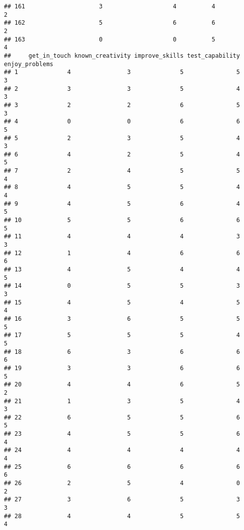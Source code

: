 \documentclass[
]{article}
\begin{document}
\begin{verbatim}
## 161                     3                    4          4               2
## 162                     5                    6          6               2
## 163                     0                    0          5               4
##     get_in_touch known_creativity improve_skills test_capability enjoy_problems
## 1              4                3              5               5              3
## 2              3                3              5               4              3
## 3              2                2              6               5              3
## 4              0                0              6               6              5
## 5              2                3              5               4              3
## 6              4                2              5               4              5
## 7              2                4              5               5              4
## 8              4                5              5               4              4
## 9              4                5              6               4              5
## 10             5                5              6               6              5
## 11             4                4              4               3              3
## 12             1                4              6               6              6
## 13             4                5              4               4              5
## 14             0                5              5               3              3
## 15             4                5              4               5              4
## 16             3                6              5               5              5
## 17             5                5              5               4              5
## 18             6                3              6               6              6
## 19             3                3              6               6              5
## 20             4                4              6               5              2
## 21             1                3              5               4              3
## 22             6                5              5               6              5
## 23             4                5              5               6              4
## 24             4                4              4               4              4
## 25             6                6              6               6              6
## 26             2                5              4               0              2
## 27             3                6              5               3              3
## 28             4                4              5               5              4

\end{verbatim}
\end{document}
